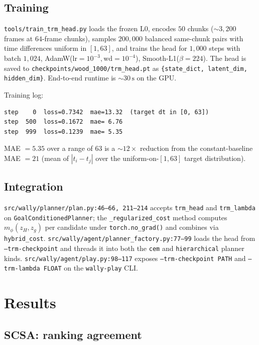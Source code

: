 \documentclass[11pt]{article}
\begin{document}
\subsection{Training}

\texttt{tools/train\_trm\_head.py} loads the frozen L0, encodes
$50$ chunks ($\sim 3{,}200$ frames at $64$-frame chunks), samples
$200{,}000$ balanced same-chunk pairs with time differences
uniform in $[1, 63]$, and trains the head for $1{,}000$ steps
with batch $1{,}024$, AdamW($\mathrm{lr}=10^{-3},
\mathrm{wd}=10^{-4}$), Smooth-L1($\beta = 224$).
The head is saved to
\texttt{checkpoints/wood\_1000/trm\_head.pt} as
\texttt{\{state\_dict, latent\_dim, hidden\_dim\}}. End-to-end
runtime is $\sim 30\,\mathrm{s}$ on the GPU.

Training log:
\begin{verbatim}
step    0  loss=0.7342  mae=13.32  (target dt in [0, 63])
step  500  loss=0.1672  mae= 6.76
step  999  loss=0.1239  mae= 5.35
\end{verbatim}
MAE $= 5.35$ over a range of $63$ is a $\sim 12\times$ reduction
from the constant-baseline MAE $= 21$ (mean of $|t_i - t_j|$
over the uniform-on-$[1,63]$ target distribution).

\subsection{Integration}

\texttt{src/wally/planner/plan.py:46--66, 211--214} accepts
\texttt{trm\_head} and \texttt{trm\_lambda} on
\texttt{GoalConditionedPlanner}; the
\texttt{\_regularized\_cost} method computes
$m_\phi(z_H, z_g)$ per candidate under
\texttt{torch.no\_grad()} and combines via
\texttt{hybrid\_cost}. \texttt{src/wally/agent/planner\_factory.py:77--99}
loads the head from \texttt{--trm-checkpoint} and threads it
into both the \texttt{cem} and \texttt{hierarchical} planner
kinds. \texttt{src/wally/agent/play.py:98--117} exposes
\texttt{--trm-checkpoint PATH} and
\texttt{--trm-lambda FLOAT} on the \texttt{wally-play} CLI.

\section{Results}
\label{sec:results}

\subsection{SCSA: ranking agreement}
\label{ssec:results-scsa}
\end{document}
